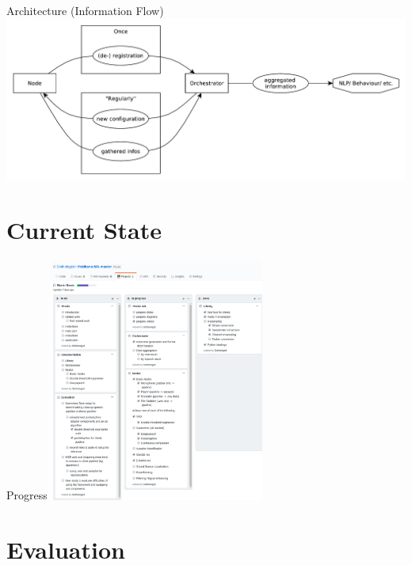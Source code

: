 \documentclass{beamer}
\begin{document}
	\begin{frame}{Architecture (Information Flow)}
		\centering
		\includegraphics[width=\textwidth]{Bilder/orchestrator}
	\end{frame}
	
	
	
	
	
	
	
	
	\section{Current State}
	\begin{frame}{Progress}
		\centering
		\includegraphics[height=8cm]{Bilder/progress}
	\end{frame}
	
	
	
	
	
	
	
	
	
	\section{Evaluation}
	
\end{document}
